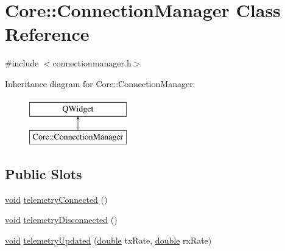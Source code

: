 \hypertarget{class_core_1_1_connection_manager}{\section{Core\-:\-:Connection\-Manager Class Reference}
\label{class_core_1_1_connection_manager}
}


{\ttfamily \#include $<$connectionmanager.\-h$>$}

Inheritance diagram for Core\-:\-:Connection\-Manager\-:\begin{figure}[H]
\begin{center}
\leavevmode
\includegraphics[height=2.000000cm]{class_core_1_1_connection_manager}
\end{center}
\end{figure}
\subsection*{Public Slots}
\begin{DoxyCompactItemize}
\item 
\hyperlink{group___u_a_v_objects_plugin_ga444cf2ff3f0ecbe028adce838d373f5c}{void} \hyperlink{group___core_plugin_ga4de138b49205db93c52a0b23f9147099}{telemetry\-Connected} ()
\item 
\hyperlink{group___u_a_v_objects_plugin_ga444cf2ff3f0ecbe028adce838d373f5c}{void} \hyperlink{group___core_plugin_ga4ab94ed9731bab394302b0d9e86712d4}{telemetry\-Disconnected} ()
\item 
\hyperlink{group___u_a_v_objects_plugin_ga444cf2ff3f0ecbe028adce838d373f5c}{void} \hyperlink{group___core_plugin_ga71e85da70aaddce0e037f95505cbc054}{telemetry\-Updated} (\hyperlink{_super_l_u_support_8h_a8956b2b9f49bf918deed98379d159ca7}{double} tx\-Rate, \hyperlink{_super_l_u_support_8h_a8956b2b9f49bf918deed98379d159ca7}{double} rx\-Rate)
\end{DoxyCompactItemize}

